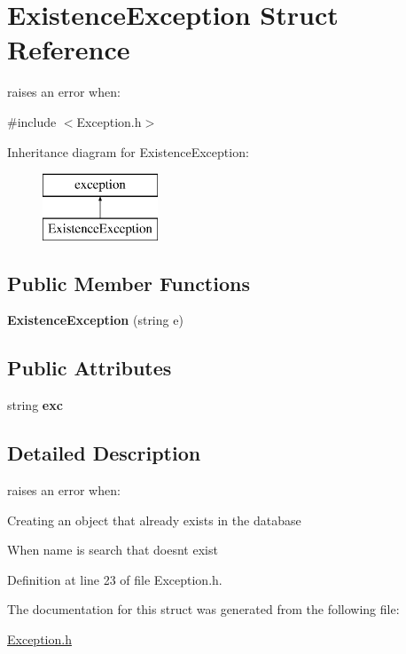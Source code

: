 \hypertarget{struct_existence_exception}{}\section{Existence\+Exception Struct Reference}
\label{struct_existence_exception}


raises an error when\+:  




{\ttfamily \#include $<$Exception.\+h$>$}

Inheritance diagram for Existence\+Exception\+:\begin{figure}[H]
\begin{center}
\leavevmode
\includegraphics[height=2.000000cm]{struct_existence_exception}
\end{center}
\end{figure}
\subsection*{Public Member Functions}
\begin{DoxyCompactItemize}
\item 
\mbox{\label{struct_existence_exception_a86e1761ed366c572298822d9c043a633}} 
{\bfseries Existence\+Exception} (string e)
\end{DoxyCompactItemize}
\subsection*{Public Attributes}
\begin{DoxyCompactItemize}
\item 
\mbox{\label{struct_existence_exception_a00febeb452ceafcd9c338bb30dda1a46}} 
string {\bfseries exc}
\end{DoxyCompactItemize}


\subsection{Detailed Description}
raises an error when\+: 


\begin{DoxyItemize}
\item Creating an object that already exists in the database
\item When name is search that doesn\textquotesingle{}t exist 
\end{DoxyItemize}

Definition at line 23 of file Exception.\+h.



The documentation for this struct was generated from the following file\+:\begin{DoxyCompactItemize}
\item 
\mbox{\hyperlink{_exception_8h}{Exception.\+h}}\end{DoxyCompactItemize}
